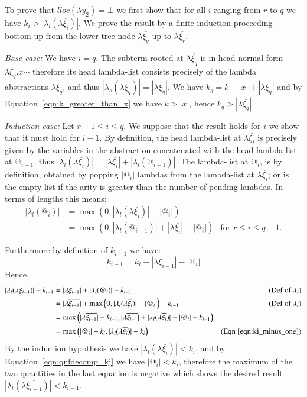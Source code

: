 \documentclass{elsarticle}
\theoremstyle{plain}
\theoremstyle{definition}
\theoremstyle{remark}
\begin{document}
\begin{enumerate}
To prove that $lloc(\lambda\overline{y_2}) =\bot$ we first show that for all $i$ ranging from $r$ to $q$ we have
 $k_i>|\lambda_l(\lambda\overline{\xi_i})|$. We prove the result by a finite induction proceeding bottom-up from the lower tree node
 $\lambda\overline{\xi_q}$ up to $\lambda\overline{\xi_r}$.

\emph{Base case:} We have $i=q$. The subterm
rooted at $\lambda\overline{\xi_q}$ is in head normal form
$\lambda\overline{\xi_q}. x \cdots$ therefore its head lambda-list consists precisely of the lambda abstractions $\lambda\overline{\xi_q}$, and thus
$|\lambda_s(\lambda\overline{\xi_q})| = |\lambda\overline{\xi_q}|$.
We have $k_q = k -|x| + |\lambda\overline{\xi_q}|$ and by Equation~\ref{eqn:k_greater_than_x} we have $k>|x|$, hence $k_q >|\lambda\overline{\xi_q}|$.


\emph{Induction case:} Let $r+1\leq i \leq q$. We suppose that the result holds for $i$ we show that it must hold for $i-1$. By definition, the head lambda-list at $\lambda\overline{\xi_i}$ is precisely given by the variables in the abstraction concatenated with the head lambda-list at $@_{i+1}$, thus $|\lambda_l(\lambda\overline{\xi_i})| =
|\lambda\overline{\xi_i}| + |\lambda_l(@_{i+1})|$. The lambda-list at $@_i$, is by definition, obtained by popping $|@_i|$ lambdas from the lambda-list at $\lambda\overline{\xi_i}$; or is the empty list if the arity is greater than the number of pending lambdas. In terms of lengths this means:
\begin{align*}
    |\lambda_l(@_i)| &= \max(0, |\lambda_l(\lambda\overline{\xi_i})| - |@_i|) \\
     &= \max\left( 0, |\lambda_l(@_{i+1})| + |\lambda\overline{\xi_i}| - |@_i| \right) & \mbox{for $r\leq i \leq q-1$.}
\end{align*}

Furthermore by definition of $k_{i-1}$ we have:
\begin{equation}
k_{i-1} = k_i + |\lambda\overline{\xi_{i-1}}| - |@_i| \label{eqn:ki_minus_one}
\end{equation}
Hence,
\begin{align*}
    |\lambda_l(\lambda\overline{\xi_{i-1}})| - k_{i-1}
    &= |\lambda\overline{\xi_{i-1}}| +|\lambda_l(@_i)| - k_{i-1} &\mbox{(Def~of $\lambda_l$)}\\
    &= |\lambda\overline{\xi_{i-1}}| + \max\left( 0, |\lambda_l(\lambda\overline{\xi_i})| - |@_i| \right) - k_{i-1} &\mbox{(Def~of $\lambda_l$)}\\
    &= \max\left( |\lambda\overline{\xi_{i-1}}| - k_{i-1},    |\lambda\overline{\xi_{i-1}}| + |\lambda_l(\lambda\overline{\xi_i})| - |@_i| - k_{i-1} \right) \\
    &= \max\left(  |@_i|- k_i, |\lambda_l(\lambda\overline{\xi_i})| - k_i \right) &\mbox{(Eqn~\ref{eqn:ki_minus_one})}
\end{align*}
By the induction hypothesis we have $|\lambda_l(\lambda\overline{\xi_i})| < k_i$, and by Equation~\ref{eqn:qnfdecomp_kj} we have $ |@_i|< k_i$, therefore the maximum of the two quantities in the last equation is negative which shows
the desired result $|\lambda_l(\lambda\overline{\xi_{i-1}})| < k_{i-1}$.


\end{enumerate}
\end{document}

